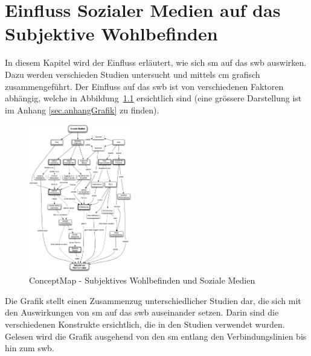 %
%
\thispagestyle{empty}
\chapter{Einfluss Sozialer Medien auf das Subjektive Wohlbefinden}\label{chap.einfluss}
\glsresetall
In diesem Kapitel wird der Einfluss erläutert, wie sich \gls{sm} auf das \gls{swb} auswirken. Dazu werden verschieden Studien untersucht und mittels \gls{cm} grafisch zusammengeführt. Der Einfluss auf das \gls{swb} ist von verschiedenen Faktoren abhängig, welche in Abbildung~\ref{fig.ConceptMapSwbSm} ersichtlich sind (eine grössere Darstellung ist im Anhang \ref{sec.anhangGrafik} zu finden).
\begin{figure}[h]
	\centering
		\includegraphics[width=0.4\textwidth]{images/grafiken/conceptMap_Swb_Sm_v2.pdf}
	\caption{ConceptMap - Subjektives Wohlbefinden und Soziale Medien}
	\label{fig.ConceptMapSwbSm}
\end{figure} \newline
Die Grafik stellt einen Zusammenzug unterschiedlicher Studien dar, die sich mit den Auswirkungen von \gls{sm} auf das \gls{swb} auseinander setzen. Darin sind die verschiedenen Konstrukte ersichtlich, die in den Studien verwendet wurden. Gelesen wird die Grafik ausgehend von den \gls{sm} entlang den Verbindungslinien bis hin zum \gls{swb}.\newline
